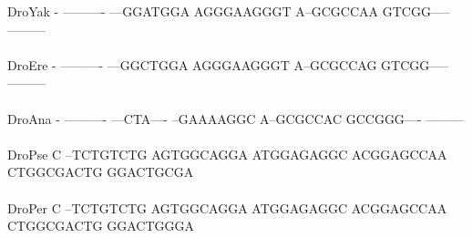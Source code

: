 \documentclass[11pt,twoside,reqno,a4paper]{article}
\begin{document}
{DroYak	-	----------	---GGATGGA	AGGGAAGGGT	A--GCGCCAA	GTCGG-----	---------\\
\hspace*{7\charwidth}\hspace*{1\charwidth}\hspace*{1\charwidth}\hspace*{1\charwidth}\hspace*{1\charwidth}\hspace*{1\charwidth}\hspace*{1\charwidth}\\
DroEre	-	----------	---GGCTGGA	AGGGAAGGGT	A--GCGCCAG	GTCGG-----	---------\\
\hspace*{7\charwidth}\hspace*{1\charwidth}\hspace*{1\charwidth}\hspace*{1\charwidth}\hspace*{1\charwidth}\hspace*{1\charwidth}\hspace*{1\charwidth}\\
DroAna	-	----------	---CTA----	--GAAAAGGC	A--GCGCCAC	GCCGGG----	---------\\
\hspace*{7\charwidth}\hspace*{1\charwidth}\hspace*{1\charwidth}\hspace*{1\charwidth}\hspace*{1\charwidth}\hspace*{1\charwidth}\hspace*{1\charwidth}\\
DroPse	C	--TCTGTCTG	AGTGGCAGGA	ATGGAGAGGC	ACGGAGCCAA	CTGGCGACTG	GGACTGCGA\\
\hspace*{7\charwidth}\hspace*{1\charwidth}\hspace*{1\charwidth}\hspace*{1\charwidth}\hspace*{1\charwidth}\hspace*{1\charwidth}\hspace*{1\charwidth}\\
DroPer	C	--TCTGTCTG	AGTGGCAGGA	ATGGAGAGGC	ACGGAGCCAA	CTGGCGACTG	GGACTGGGA\\
\hspace*{7\charwidth}\hspace*{1\charwidth}\hspace*{1\charwidth}\hspace*{1\charwidth}\hspace*{1\charwidth}\hspace*{1\charwidth}\hspace*{1\charwidth}\\
}
\end{document}
